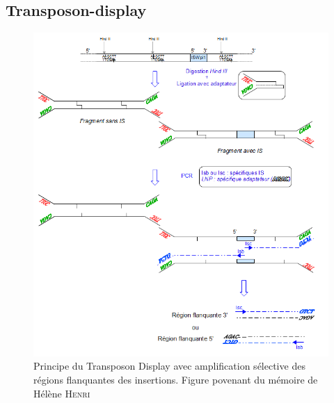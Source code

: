\subsection{Transposon-display} %
\label{sub:transposon_display}
\begin{figure}[h]
	\begin{center}
		\includegraphics[width=160mm]{tdisplay.png}
	\end{center}
	\caption{Principe du Transposon Display avec amplification sélective des régions
flanquantes des insertions. Figure povenant du mémoire de Hélène \textsc{Henri}\cite{memHH}}
	\label{fig:figure1}
\end{figure}

